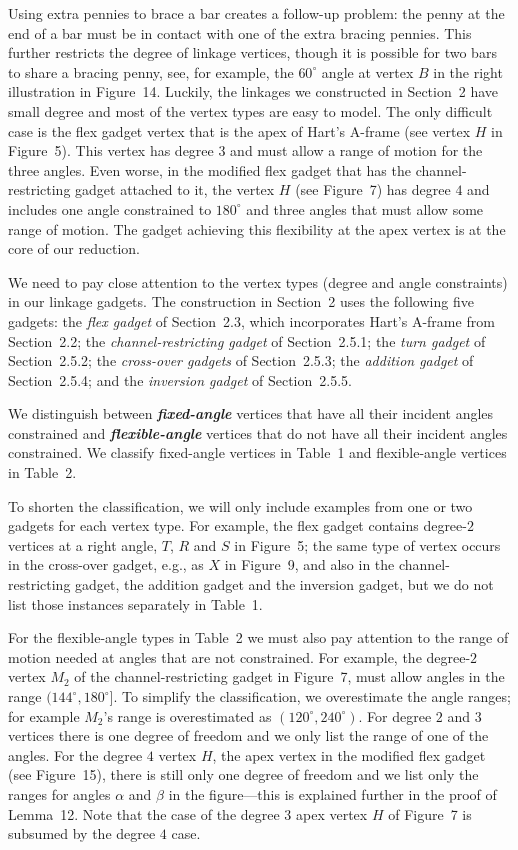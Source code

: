 \documentclass{article}
\newcommand{\defn}[1]{\textit{\textbf{\boldmath #1}}}
\begin{document}
Using extra pennies to brace a bar creates a follow-up problem: the penny at the end of a bar must be in contact with one of the extra bracing pennies.
This further restricts the degree of linkage vertices, though it is possible for two bars to share a bracing penny, see, for example, the 
$60^{\circ}$ angle at vertex $B$ in the right illustration in Figure~14.
Luckily, the linkages we constructed in Section~2 have small degree and most of the vertex types are easy to model. The only difficult case is the flex gadget vertex that is the apex of Hart's A-frame (see vertex $H$ in 
Figure~5). This vertex has degree $3$ and must allow a range of motion for the three angles. 
Even worse, in the modified flex gadget that has the channel-restricting gadget attached to it, the vertex $H$ (see Figure~7) 
has degree $4$ and includes one angle constrained to $180^\circ$ and three angles that must allow some range of motion.   
The gadget achieving this flexibility at the apex vertex is 
at the core of our reduction.

We need to pay close attention to the vertex types (degree and angle constraints) in our linkage gadgets. The construction in Section~2 uses the following five gadgets: 
the {\em flex gadget} of Section~2.3, which incorporates Hart's A-frame from Section~2.2;
the {\em channel-restricting gadget} of Section~2.5.1;
the {\em turn gadget} of Section~2.5.2;
the {\em cross-over gadgets} of Section~2.5.3;
the {\em addition gadget} of  Section~2.5.4; and
the  {\em inversion gadget} of Section~2.5.5.

We distinguish between \defn{fixed-angle} vertices that have all their incident angles constrained and \defn{flexible-angle} vertices 
that do not have all their incident angles constrained. We classify fixed-angle vertices in Table~1 and flexible-angle vertices in Table~2.

To shorten the classification, we will only include examples from one
or two gadgets for each vertex type. For example, the flex gadget contains degree-$2$ vertices at a right angle, $T$, $R$ and $S$ in Figure~5; the same type of vertex occurs in the cross-over gadget, e.g., as $X$ in Figure~9, and 
also in the channel-restricting gadget, the addition gadget and the inversion gadget, but we do not list those instances separately in Table~1. 

For the flexible-angle types in Table~2 we must also pay attention to the range of motion needed at angles that are not constrained.  
For example, the degree-$2$ vertex $M_2$ of the channel-restricting gadget in Figure~7, must allow angles in the range $(144^\circ, 180^\circ]$. 
To simplify the classification, we overestimate the angle ranges; for example $M_2$'s range is overestimated as $(120^\circ, 240^\circ)$. 
For degree $2$ and $3$ vertices there is one degree of freedom and we only list the range of one of the angles. 
For the degree $4$ vertex $H$, the apex vertex in the modified flex gadget (see Figure~15), 
there is still only one degree of freedom and we list 
only the ranges for angles $\alpha$ and $\beta$ in the figure---this is explained further in the proof of Lemma~12. 
Note that the case of the degree $3$ apex vertex $H$ of Figure~7
is subsumed by the degree $4$ case.
\end{document}
